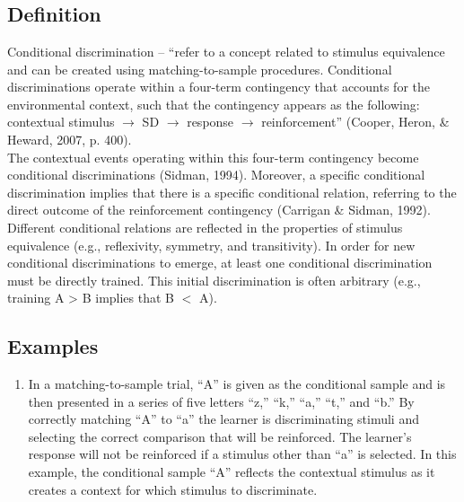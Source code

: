 \clearpage \section{\fourFKThirtyFour{}}
\subsection{Definition}
Conditional discrimination – ``refer to a concept related to stimulus equivalence and can be created using matching-to-sample procedures.  Conditional discriminations operate within a four-term contingency that accounts for the environmental context, such that the contingency appears as the following: contextual stimulus $\rightarrow$ SD $\rightarrow$ response $\rightarrow$ reinforcement'' (Cooper, Heron, \& Heward, 2007, p. 400).\\

The contextual events operating within this four-term contingency become conditional discriminations (Sidman, 1994).   Moreover, a specific conditional discrimination implies that there is a specific conditional relation, referring to the direct outcome of the reinforcement contingency (Carrigan \& Sidman, 1992).  Different conditional relations are reflected in the properties of stimulus equivalence (e.g., reflexivity, symmetry, and transitivity).  In order for new conditional discriminations to emerge, at least one conditional discrimination must be directly trained.  This initial discrimination is often arbitrary (e.g., training A > B implies that B $<$ A). 
%
\subsection{Examples}
\begin{enumerate}
\item In a matching-to-sample trial, ``A'' is given as the conditional sample and is then presented in a series of five letters ``z,'' ``k,'' ``a,'' ``t,'' and ``b.''  By correctly matching ``A'' to ``a'' the learner is discriminating stimuli and selecting the correct comparison that will be reinforced.  The learner's response will not be reinforced if a stimulus other than ``a'' is selected.  In this example, the conditional sample ``A'' reflects the contextual stimulus as it creates a context for which stimulus to discriminate.  
%
\end{enumerate}
%
